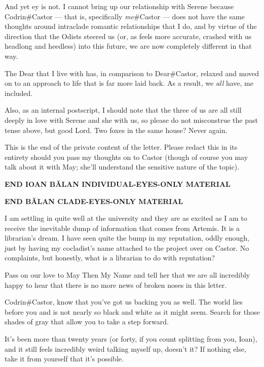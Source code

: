 And yet ey is not. I cannot bring up our relationship with Serene because Codrin\#Castor — that is, specifically \emph{me}\#Castor — does not have the same thoughts around intraclade romantic relationships that I do, and by virtue of the direction that the Odists steered us (or, as feels more accurate, crashed with us headlong and heedless) into this future, we are now completely different in that way.

The Dear that I live with has, in comparison to Dear\#Castor, relaxed and moved on to an approach to life that is far more laid back. As a result, we \emph{all} have, me included.

Also, as an internal postscript, I should note that the three of us are all still deeply in love with Serene and she with us, so please do not misconstrue the past tense above, but good Lord. Two foxes in the same house? Never again.

This is the end of the private content of the letter. Please redact this in its entirety should you pass my thoughts on to Castor (though of course you may talk about it with May; she'll understand the sensitive nature of the topic).

\begin{center}
\textbf{END IOAN BĂLAN INDIVIDUAL-EYES-ONLY MATERIAL}
\end{center}

\begin{center}
\textbf{END BĂLAN CLADE-EYES-ONLY MATERIAL}
\end{center}

I am settling in quite well at the university and they are as excited as I am to receive the inevitable dump of information that comes from Artemis. It is a librarian's dream. I have seen quite the bump in my reputation, oddly enough, just by having my cocladist's name attached to the project over on Castor. No complaints, but honestly, what is a librarian to do with reputation?

Pass on our love to May Then My Name and tell her that we are all incredibly happy to hear that there is no more news of broken noses in this letter.

Codrin\#Castor, know that you've got us backing you as well. The world lies before you and is not nearly so black and white as it might seem. Search for those shades of gray that allow you to take a step forward.

It's been more than twenty years (or forty, if you count splitting from you, Ioan), and it still feels incredibly weird talking myself up, doesn't it? If nothing else, take it from yourself that it's possible.


